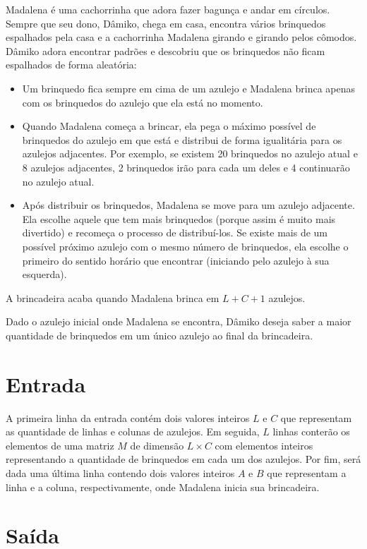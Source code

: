 Madalena é uma cachorrinha que adora fazer bagunça e andar em círculos. Sempre que seu dono, Dâmiko, chega em casa, encontra vários brinquedos espalhados pela casa e a cachorrinha Madalena girando e girando pelos cômodos.
Dâmiko adora encontrar padrões e descobriu que os brinquedos não ficam espalhados de forma aleatória:

\begin{itemize}
  \item Um brinquedo fica sempre em cima de um azulejo e Madalena brinca apenas com os brinquedos do azulejo que ela está no momento.
  \item Quando Madalena começa a brincar, ela pega o máximo possível de brinquedos do azulejo em que está e distribui de forma igualitária para os azulejos adjacentes. Por exemplo, se existem 20 brinquedos no azulejo atual e 8 azulejos adjacentes, 2 brinquedos irão para cada um deles e 4 continuarão no azulejo atual.
  \item Após distribuir os brinquedos, Madalena se move para um azulejo adjacente. Ela escolhe aquele que tem mais brinquedos (porque assim é muito mais divertido) e recomeça o processo de distribuí-los. Se existe mais de um possível próximo azulejo com o mesmo número de brinquedos, ela escolhe o primeiro do sentido horário que encontrar (iniciando pelo azulejo à sua esquerda).
\end{itemize}

A brincadeira acaba quando Madalena brinca em $L + C + 1$ azulejos.

Dado o azulejo inicial onde Madalena se encontra, Dâmiko deseja saber a maior quantidade de brinquedos em um único azulejo ao final da brincadeira.

\section*{Entrada}

A primeira linha da entrada contém dois valores inteiros $L$ e $C$ que representam as quantidade de linhas e colunas de azulejos. Em seguida, $L$ linhas conterão os elementos de uma matriz $M$ de dimensão $L \times C$ com elementos inteiros representando a quantidade de brinquedos em cada um dos azulejos.
Por fim, será dada uma última linha contendo dois valores inteiros $A$ e $B$ que representam a linha e a coluna, respectivamente, onde Madalena inicia sua brincadeira.

\section*{Saída}

